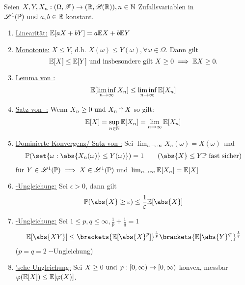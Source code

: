 \begin{proposition}
	Seien $X,Y,X_n: (\Omega,\mathscr F) \to (\mathbb{R}, \mathscr{B}(\mathbb{R})), n \in \mathbb{N}$ Zufallsvariablen in $\mathscr{L}^{1}(\mathbb{P})\text{ und } a,b \in \mathbb{R}$ konstant.
	\begin{enumerate}
		\item \ul{Linearität:} $\mathbb{E}[aX +bY] = a\mathbb{E} X + b\mathbb{E} Y$
		\item \ul{Monotonie:} $X \le Y$, d.h. $X(\omega) \le Y(\omega), \forall \omega \in \Omega$. Dann gilt 
		\[
			\mathbb{E}[X] \le \mathbb{E}[Y] \text{ und insbesondere gilt } X \ge 0 \implies \mathbb{E} X \ge 0.
		\]
		\item \ul{Lemma von :}
		\begin{align*}
			\mathbb{E}[\liminf_{n \to \infty}X_n] \le \liminf_{n \to \infty} \mathbb{E}[X_n]
		\end{align*}
		\item \ul{Satz von -:} Wenn $X_n \ge 0 \text{ und } X_n \uparrow X$ so gilt:
		\begin{align*}
			\mathbb{E}[X] = \sup_{n \in \mathbb{N}} \mathbb{E}[X_n] = \lim_{n \to \infty} \mathbb{E}[X_n]
		\end{align*}
		\item \ul{Dominierte Konvergenz/ Satz von :} Sei $\lim_{n \to \infty} X_n(\omega) = X(\omega)$ und
		\begin{align*}
		\P(\set{\omega: \abs{X_n(\omega)} \le Y(\omega)}) = 1 \qquad (\abs{X} \le Y \P \text{ fast sicher})
		\end{align*}
		für $Y \in \mathscr{L}^{1}(\mathbb{P}) \implies X \in \mathscr{L}^{1}(\mathbb{P}) \text{ und } \lim_{n \to \infty} \mathbb{E}[X_n] = \mathbb{E}[X]$
		\item \ul{-Ungleichung:} Sei $\epsilon > 0$, dann gilt
		\begin{align*}
		\P(\abs{X} \ge \epsilon) \le \frac{1}{\epsilon} \E[\abs{X}]
		\end{align*}
		\item \ul{-Ungleichung:} Sei $1 \le p,q\le \infty, \frac{1}{p}+ \frac{1}{q} = 1$
		\begin{align*}
		\E[\abs{XY}] \le \brackets{\E[\abs{X}^p]}^{\frac{1}{p}} \brackets{\E[\abs{Y}^q]}^{\frac{1}{q}}
		\end{align*}
		($p =q =2$ --Ungleichung)
		\item \ul{'sche Ungleichung:} Sei $X \ge 0 \text{ und } \varphi: [0,\infty) \to [0,\infty)$ konvex, messbar \\
		$\varphi(\mathbb{E}[X]) \le \mathbb{E}[\varphi(X)]$.
	\end{enumerate}
\end{proposition}
